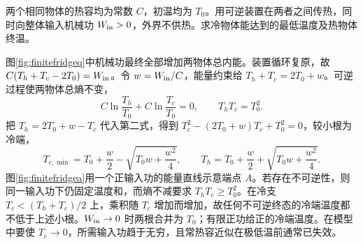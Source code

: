 \begin{example}[给定输入功对两个有限物体制冷]
\label{ex:finitefridge}
两个相同物体的热容均为常数 $C$，初温均为 $T_0$。用可逆装置在两者之间传热，同时向整体输入机械功 $W_{\rm in}>0$，外界不供热。求冷物体能达到的最低温度及热物体终温。
\end{example}
\begin{solution}
图\ref{fig:finitefridgeq}中机械功最终全部增加两物体总内能。装置循环复原，故
$C(T_h+T_c-2T_0)=W_{\rm in}$。令 $w=W_{\rm in}/C$，能量约束给 $T_h+T_c=2T_0+w$。可逆过程使两物体总熵不变，
\[
 C\ln\frac{T_h}{T_0}+C\ln\frac{T_c}{T_0}=0,
 \qquad T_hT_c=T_0^2.
\]
把 $T_h=2T_0+w-T_c$ 代入第二式，得到
$T_c^2-(2T_0+w)T_c+T_0^2=0$，较小根为冷端，
\[
 T_{c,\min}=T_0+\frac w2-\sqrt{T_0w+\frac{w^2}{4}},
 \qquad
 T_h=T_0+\frac w2+\sqrt{T_0w+\frac{w^2}{4}}.
\]
图\ref{fig:finitefridgea}用一个正输入功的能量直线示意端点 $A$。若存在不可逆性，则同一输入功下仍固定温度和，而熵不减要求 $T_hT_c\ge T_0^2$。在冷支 $T_c<(T_h+T_c)/2$ 上，乘积随 $T_c$ 增加而增加，故任何不可逆终态的冷端温度都不低于上述小根。$W_{\rm in}\to0$ 时两根合并为 $T_0$；有限正功给正的冷端温度。在模型中要使 $T_c\to0$，所需输入功趋于无穷，且常热容近似在极低温前通常已失效。
\end{solution}

